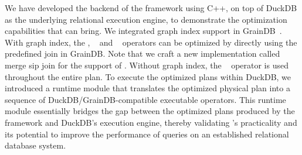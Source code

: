 We have developed the backend of the \name framework using C++, on top of DuckDB as the underlying relational execution engine, to demonstrate the optimization capabilities that \name can bring.
We integrated graph index support in GrainDB~\cite{graindb}. %
With graph index, the \expand, \expandedge~ and \getvertex~ operators can be optimized by directly using the predefined join in GrainDB.
Note that we craft a new implementation called merge sip join for the support of \expandintersect.
Without graph index, the \hashjoin~ operator is used throughout the entire plan.
To execute the optimized plans within DuckDB, we introduced a runtime module that translates the optimized physical plan into a sequence of DuckDB/GrainDB-compatible executable operators.
This runtime module essentially bridges the gap between the optimized plans produced by the \name framework and DuckDB's execution engine, thereby validating \name's practicality and its potential to improve the performance of \spjm queries on an established relational database system.


